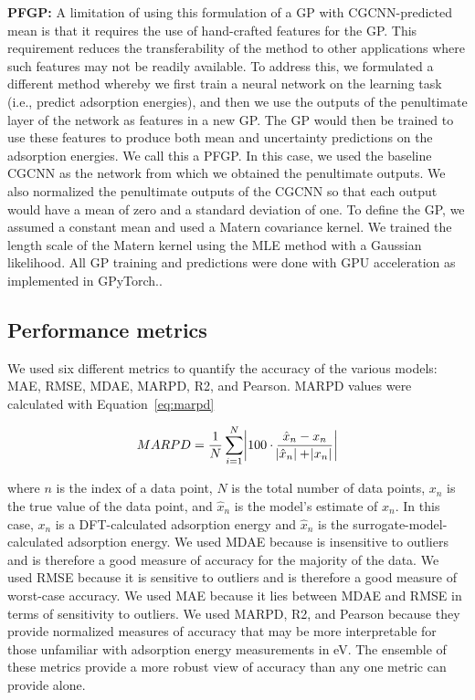 \documentclass[]{achemso}
\begin{document}
\textbf{\gls{PFGP}:}
A limitation of using this formulation of a \gls{GP} with \gls{CGCNN}-predicted mean is that it requires the use of hand-crafted features for the \gls{GP}.
This requirement reduces the transferability of the method to other applications where such features may not be readily available.
To address this, we formulated a different method whereby we first train a neural network on the learning task (i.e., predict adsorption energies), and then we use the outputs of the penultimate layer of the network as features in a new \gls{GP}.
The \gls{GP} would then be trained to use these features to produce both mean and uncertainty predictions on the adsorption energies.
We call this a \gls{PFGP}.
In this case, we used the baseline \gls{CGCNN} as the network from which we obtained the penultimate outputs.
We also normalized the penultimate outputs of the \gls{CGCNN} so that each output would have a mean of zero and a standard deviation of one.
To define the \gls{GP}, we assumed a constant mean and used a Matern covariance kernel.
We trained the length scale of the Matern kernel using the \gls{MLE} method with a Gaussian likelihood.
All GP training and predictions were done with GPU acceleration as implemented in GPyTorch.\cite{Gardner2018}.


\subsection{Performance metrics}

We used six different metrics to quantify the accuracy of the various models:  \gls{MAE}, \gls{RMSE}, \gls{MDAE}, \gls{MARPD}, \gls{R2}, and \gls{Pearson}.
\gls{MARPD} values were calculated with Equation~\ref{eq:marpd}

\begin{equation}\label{eq:marpd}
    MARPD = \frac{1}{N} \sum_{i=1}^{N} \abs{100 \cdot \frac{\hat{x}_n - x_n}{\abs{\hat{x}_n} + \abs{x_n}}}
\end{equation}

\noindent where $n$ is the index of a data point, $N$ is the total number of data points, $x_n$ is the true value of the data point, and $\hat{x}_n$ is the model's estimate of $x_n$.
In this case, $x_n$ is a DFT-calculated adsorption energy and $\hat{x}_n$ is the surrogate-model-calculated adsorption energy.
We used \gls{MDAE} because is insensitive to outliers and is therefore a good measure of accuracy for the majority of the data.
We used \gls{RMSE} because it is sensitive to outliers and is therefore a good measure of worst-case accuracy.
We used \gls{MAE} because it lies between \gls{MDAE} and \gls{RMSE} in terms of sensitivity to outliers.
We used \gls{MARPD}, \gls{R2}, and \gls{Pearson} because they provide normalized measures of accuracy that may be more interpretable for those unfamiliar with adsorption energy measurements in eV.
The ensemble of these metrics provide a more robust view of accuracy than any one metric can provide alone.
\end{document}
